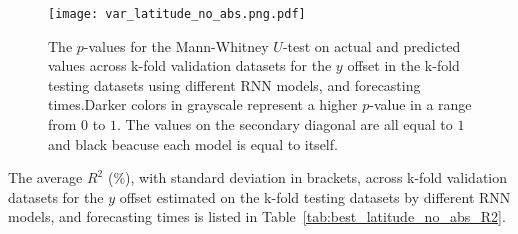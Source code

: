 \begin{figure}[!ht]
	\centering
	\texttt{[image: var\_latitude\_no\_abs.png.pdf]}
	\caption{The $p$-values for the Mann-Whitney $U$-test on actual and predicted values across k-fold validation datasets for the $y$ offset in the k-fold testing datasets using different RNN models, and forecasting times.Darker colors in grayscale represent a higher $p$-value in a range from $0$ to $1$. The values on the secondary diagonal are all equal to $1$ and black beacuse each model is equal to itself.}
	\label{fig:var_latitude_no_abs.png}
\end{figure}

The average $R^{2}$ (\%), with standard deviation in brackets, across k-fold validation datasets for the $y$ offset estimated on the k-fold testing datasets by different RNN models, and forecasting times is listed in Table~\ref{tab:best_latitude_no_abs_R2}.

\begin{table}[!ht]
	\centering
	\caption{The average $R^{2}$ (\%), with standard deviation in brackets, across k-fold validation datasets for the $y$ offset estimated on the k-fold testing datasets by different RNN models, and forecasting times.}
	\label{tab:best_latitude_no_abs_R2}
\end{table}

